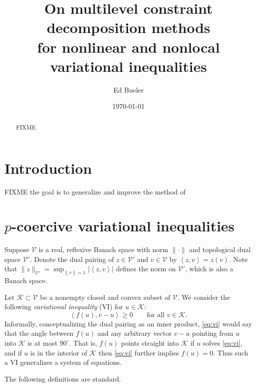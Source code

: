 \documentclass[letterpaper,final,12pt,reqno]{amsart}
\theoremstyle{cstyle}
\theoremstyle{dstyle}
\numberwithin{equation}{section}
\numberwithin{figure}{section}
\numberwithin{table}{section}
\numberwithin{theorem}{section}
\newcommand{\cK}{\mathcal{K}}
\newcommand{\cV}{\mathcal{V}}
\newcommand{\ip}[2]{\left<#1,#2\right>}
\begin{document}
\title[On MCD methods for nonlinear and nonlocal VIs]{On multilevel constraint decomposition methods \\ for nonlinear and nonlocal variational inequalities}

\author{Ed Bueler}

\date{\today}

\begin{abstract} FIXME
\end{abstract}

\maketitle


\thispagestyle{empty}

\section{Introduction} \label{sec:intro}

FIXME the goal is to generalize and improve the method of \cite{Tai2003}

\section{$p$-coercive variational inequalities} \label{sec:vi}

Suppose $\cV$ is a real, reflexive Banach space with norm $\|\cdot\|$ and topological dual space $\cV'$.  Denote the dual pairing of $z \in \cV'$ and $v\in \cV$ by $\ip{z}{v} = z(v)$.  Note that $\|z\|_{\cV'} = \sup_{\|v\|=1} |\ip{z}{v}|$ defines the norm on $\cV'$, which is also a Banach space.

Let $\cK \subset \cV$ be a nonempty closed and convex subset of $\cV$.  We consider the following \emph{variational inequality} (VI) for $u\in \cK$:
\begin{equation}
\ip{f(u)}{v-u} \ge 0 \qquad \text{for all } v\in \cK. \label{eq:vi}
\end{equation}
Informally, conceptualizing the dual pairing as an inner product, \eqref{eq:vi} would say that the angle between $f(u)$ and any arbitrary vector $v-u$ pointing from $u$ into $\cK$ is at most $90^\circ$.  That is, $f(u)$ points straight into $\cK$ if $u$ solves \eqref{eq:vi}, and if $u$ is in the interior of $\cK$ then \eqref{eq:vi} further implies $f(u)=0$.  Thus such a VI generalizes a system of equations.

The following definitions \cite{KinderlehrerStampacchia1980} are standard.
\end{document}
